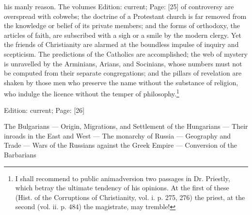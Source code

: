 his manly reason. The volumes Edition: current; Page: [25] of controversy are overspread with cobwebs; the doctrine of a Protestant church is far removed from the knowledge or belief of its private members; and the forms of orthodoxy, the articles of faith, are subscribed with a sigh or a smile by the modern clergy. Yet the friends of Christianity are alarmed at the boundless impulse of inquiry and scepticism. The predictions of the Catholics are accomplished; the web of mystery is unravelled by the Arminians, Arians, and Socinians, whose numbers must not be computed from their separate congregations; and the pillars of revelation are shaken by those men who preserve the name without the substance of religion, who indulge the licence without the temper of philosophy.\footnote{I shall recommend to public animadversion two passages in Dr. Priestly, which betray the ultimate tendency of his opinions. At the first of these (Hist. of the Corruptions of Christianity, vol. i. p. 275, 276) the priest, at the second (vol. ii. p. 484) the magistrate, may tremble!}

Edition: current; Page: [26]


The Bulgarians \texthebrew{—} Origin, Migrations, and Settlement of the Hungarians \texthebrew{—} Their inroads in the East and West \texthebrew{—} The monarchy of Russia \texthebrew{—} Geography and Trade \texthebrew{—} Wars of the Russians against the Greek Empire \texthebrew{—} Conversion of the Barbarians

